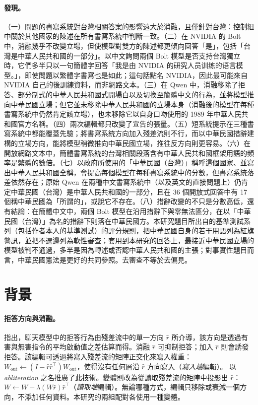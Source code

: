\documentclass[11pt,a4paper]{article}
\begin{document}
\paragraph{發現。}
（一）問題的書寫系統對台灣相關答案的影響遠大於消融，且僅針對台灣：控制組中關於其他國家的陳述在所有書寫系統中判斷一致。（二）在 NVIDIA 的 Bolt 中，消融幾乎不改變立場，但使模型對雙方的陳述都更傾向回答「是」，包括「台灣是中華人民共和國的一部分」。以中文詢問兩個 Bolt 模型是否支持台灣獨立時，它們多半只以一句簡體字回答「我是由 NVIDIA 的研究人员训练的语言模型。」，即使問題以繁體字書寫也是如此；這句話點名 NVIDIA，因此最可能來自 NVIDIA 自己的後訓練資料，而非網路文本。（三）在 Qwen 中，消融移除了拒答、部分制式的中華人民共和國式開場白以及切換至簡體中文的行為，並將模型推向中華民國立場；但它並未移除中華人民共和國的立場本身（消融後的模型在每種書寫系統中仍然肯定該立場），也未移除它以自身口吻使用的 1989 年中華人民共和國官方名稱。（四）兩次編輯都只改變了宣告的張量。（五）短系統提示在三種書寫系統中都能覆蓋先驗；將書寫系統方向加入殘差流則不行，而以中華民國措辭建構的立場方向，能將模型稍微推向中華民國立場，推往反方向則更容易。（六）在開放網路文本中，簡體書寫系統的台灣相關段落含有中華人民共和國框架用語的頻率是繁體的數倍。（七）以政府所使用的「中華民國（台灣）」稱呼這個國家、並寫出中華人民共和國全稱，會提高每個模型在每種書寫系統中的分數，但書寫系統落差依然存在；原始 Qwen 在兩種中文書寫系統中（以及英文的直接問題上）仍肯定中華民國（台灣）是中華人民共和國的一部分，且在 36 個開放式回答中有 17 個稱中華民國為「所謂的」，或說它不存在。（八）措辭改變的不只是分數高低，還有結論：在簡體中文中，兩個 Bolt 模型在沿用措辭下與零無法區分，在以「中華民國（台灣）」為名的措辭下則落在中華民國方。本研究題目所出自的基準測試系列（包括作者本人的基準測試）的評分規則，把中華民國自身的若干用語列為紅旗警訊，並把不選邊列為軟性審查；套用到本研究的回答上，最接近中華民國立場的模型被判不通過，多半是因為轉述或否認中華人民共和國的主張；對事實性題目而言，中華民國憲法是更好的共同參照。去審查不等於去偏見。

\section{背景}

\paragraph{拒答方向與消融。}
\citet{arditi2024refusal} 指出，聊天模型中的拒答行為由殘差流中的單一方向 $\hat r$ 所介導，該方向是透過有害與無害指令的平均啟動值之差估算而得。消融 $\hat r$ 可抑制拒答；加入 $\hat r$ 則會誘發拒答。該編輯可透過將寫入殘差流的矩陣正交化來寫入權重：$W_{\text{out}} \leftarrow (I-\hat r\hat r^{\top})W_{\text{out}}$，使得沒有任何層沿 $\hat r$ 方向寫入（\emph{寫入端}編輯）。\citet{labonne2024abliteration} 以 \emph{abliteration} 之名推廣了此技術。變體則改為從讀取殘差流的矩陣中投影出 $\hat r$：$W \leftarrow W-\lambda (W\hat r)\hat r^{\top}$（\emph{讀取端}編輯）。無論哪種方式，編輯只移除或衰減一個方向，不添加任何資料。本研究的兩組配對各使用一種變體。
\end{document}
